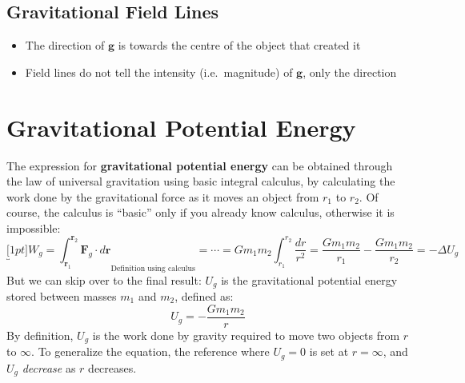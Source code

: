 \subsection{Gravitational Field Lines}

\begin{figure}[ht]
  \centering
\end{figure}
\begin{itemize}
\item The direction of $\bm g$ is towards the centre of the object that
  created it
\item Field lines do not tell the intensity (i.e.\ magnitude) of $\bm g$,
  only the direction
\end{itemize}
%
%
%
%
%




\section{Gravitational Potential Energy}
The expression for \textbf{gravitational potential energy} can be obtained
through the law of universal gravitation using basic integral calculus, by
calculating the work done by the gravitational force as it moves an object from
$r_1$ to $r_2$. Of course, the calculus is ``basic'' only if you already know
calculus, otherwise it is impossible:
\begin{equation*}
  \underbracket[1pt]{
    W_g = \int_{\bm r_1}^{\bm r_2}\bm F_g\cdot d\bm r
  }_\text{Definition using calculus}
  = \cdots = Gm_1m_2 \int_{r_1}^{r_2}\frac{dr}{r^2}
  =\frac{Gm_1m_2}{r_1} - \frac{Gm_1m_2}{r_2}=-\Delta U_g
\end{equation*}
But we can skip over to the final result: $U_g$ is the gravitational potential
energy stored between masses $m_1$ and $m_2$, defined as:
\begin{equation}
  \boxed{U_g=-\frac{Gm_1m_2}r}
  \label{eq:GPE-general}
\end{equation}
By definition, $U_g$ is the work done by gravity required to move two objects
from $r$ to $\infty$. To generalize the equation, the reference where $U_g=0$
is set at $r=\infty$, and $U_g$ \emph{decrease} as $r$ decreases.

